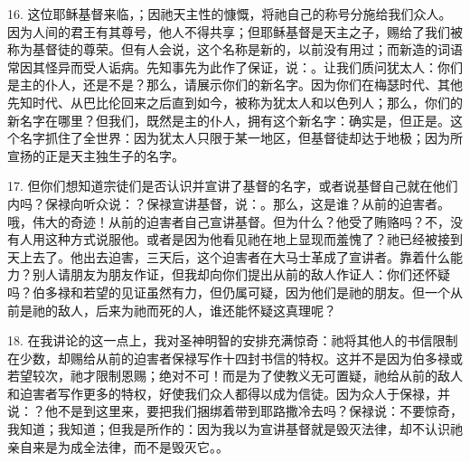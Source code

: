 16. 这位耶稣基督来临，；因祂天主性的慷慨，将祂自己的称号分施给我们众人。因为人间的君王有其尊号，他人不得共享；但耶稣基督是天主之子，赐给了我们被称为基督徒的尊荣。但有人会说，这个名称是新的，以前没有用过；而新造的词语常因其怪异而受人诟病。先知事先为此作了保证，说：。让我们质问犹太人：你们是主的仆人，还是不是？那么，请展示你们的新名字。因为你们在梅瑟时代、其他先知时代、从巴比伦回来之后直到如今，被称为犹太人和以色列人；那么，你们的新名字在哪里？但我们，既然是主的仆人，拥有这个新名字：确实是，但正是。这个名字抓住了全世界：因为犹太人只限于某一地区，但基督徒却达于地极；因为所宣扬的正是天主独生子的名字。\par

17. 但你们想知道宗徒们是否认识并宣讲了基督的名字，或者说基督自己就在他们内吗？保禄向听众说：？保禄宣讲基督，说：。那么，这是谁？从前的迫害者。哦，伟大的奇迹！从前的迫害者自己宣讲基督。但为什么？他受了贿赂吗？不，没有人用这种方式说服他。或者是因为他看见祂在地上显现而羞愧了？祂已经被接到天上去了。他出去迫害，三天后，这个迫害者在大马士革成了宣讲者。靠着什么能力？别人请朋友为朋友作证，但我却向你们提出从前的敌人作证人：你们还怀疑吗？伯多禄和若望的见证虽然有力，但仍属可疑，因为他们是祂的朋友。但一个从前是祂的敌人，后来为祂而死的人，谁还能怀疑这真理呢？\par

18. 在我讲论的这一点上，我对圣神明智的安排充满惊奇：祂将其他人的书信限制在少数，却赐给从前的迫害者保禄写作十四封书信的特权。这并不是因为伯多禄或若望较次，祂才限制恩赐；绝对不可！而是为了使教义无可置疑，祂给从前的敌人和迫害者写作更多的特权，好使我们众人都得以成为信徒。因为众人于保禄，并说：？他不是到这里来，要把我们捆绑着带到耶路撒冷去吗？保禄说：不要惊奇，我知道；我知道；但我是所作的：因为我以为宣讲基督就是毁灭法律，却不认识祂亲自来是为成全法律，而不是毁灭它。。\par

